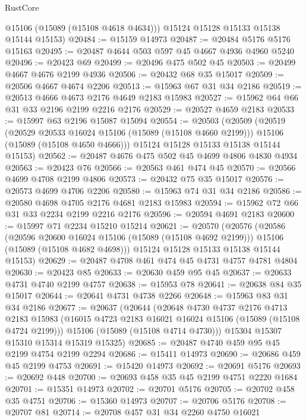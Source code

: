 \begin{lexlean}{RustCore}
\begin{coremodule}
        @15106
        (@15089 (@15108 @4618 @4634)))
      @15124
      @15128
      @15133
      @15138
      @15144
      @15153)
@20484 := @15159 @14973
@20487 := @20484 @5176 @5176 @15163
@20495 := @20487 @4644 @503 @597 @45 @4667 @4936 @4960 @5240
@20496 := @20423 @69
@20499 := @20496 @475 @502 @45
@20503 := @20499 @4667 @4676 @2199 @4936
@20506 := @20432 @68 @35 @15017
@20509 := @20506 @4667 @4674 @2206
@20513 := @15963 @67 @31 @34 @2186
@20519 := @20513 @4666 @4673 @2176 @4649 @2183 @15983
@20527 := @15962 @64 @66 @31 @33 @2196 @2199 @2216 @2176
@20529 := @20527 @4659 @2183
@20533 := @15997 @63 @2196 @15087 @15094
@20554 := @20503
    (@20509
      (@20519
        (@20529 @20533 @16024 @15106 (@15089 (@15108 @4660 @2199)))
        @15106
        (@15089 (@15108 @4650 @4666)))
      @15124
      @15128
      @15133
      @15138
      @15144
      @15153)
@20562 := @20487 @4676 @475 @502 @45 @4699 @4806 @4830 @4934
@20563 := @20423 @76
@20566 := @20563 @461 @474 @45
@20570 := @20566 @4699 @4708 @2199 @4806
@20573 := @20432 @75 @35 @15017
@20576 := @20573 @4699 @4706 @2206
@20580 := @15963 @74 @31 @34 @2186
@20586 := @20580 @4698 @4705 @2176 @4681 @2183 @15983
@20594 := @15962 @72 @66 @31 @33 @2234 @2199 @2216 @2176
@20596 := @20594 @4691 @2183
@20600 := @15997 @71 @2234 @15210 @15214
@20621 := @20570
    (@20576
      (@20586
        (@20596 @20600 @16024 @15106 (@15089 (@15108 @4692 @2199)))
        @15106
        (@15089 (@15108 @4682 @4698)))
      @15124
      @15128
      @15133
      @15138
      @15144
      @15153)
@20629 := @20487 @4708 @461 @474 @45 @4731 @4757 @4781 @4804
@20630 := @20423 @85
@20633 := @20630 @459 @95 @45
@20637 := @20633 @4731 @4740 @2199 @4757
@20638 := @15953 @78
@20641 := @20638 @84 @35 @15017
@20644 := @20641 @4731 @4738 @2266
@20648 := @15963 @83 @31 @34 @2186
@20677 := @20637
    (@20644
      (@20648
        @4730
        @4737
        @2176
        @4713
        @2183
        @15983
        (@16015 @4723 @2183 @16021 @16024 @15106 (@15089 (@15108 @4724 @2199)))
        @15106
        (@15089 (@15108 @4714 @4730)))
      @15304
      @15307
      @15310
      @15314
      @15319
      @15325)
@20685 := @20487 @4740 @459 @95 @45 @2199 @4754 @2199 @2294
@20686 := @15411 @14973
@20690 := @20686 @459 @45 @2199 @4753
@20691 := @15420 @14973
@20692 := @20691 @5176
@20693 := @20692 @448
@20700 := @20693 @458 @35 @45 @2199 @4751 @2220 @1684
@20701 := @15351 @14973
@20702 := @20701 @5176
@20705 := @20702 @458 @35 @4751
@20706 := @15360 @14973
@20707 := @20706 @5176
@20708 := @20707 @81
@20714 := @20708 @457 @31 @34 @2260 @4750 @16021

\end{coremodule}
\end{lexlean}

